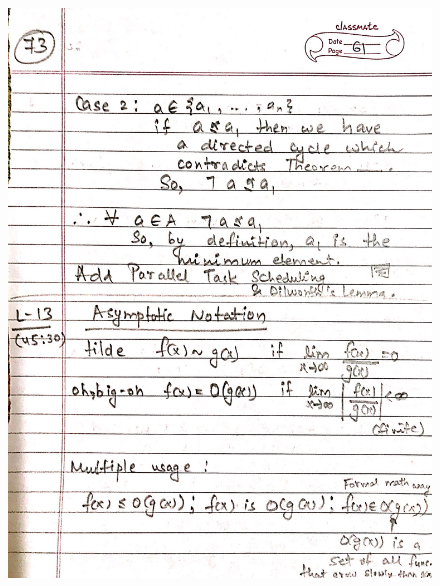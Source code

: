\begin{figure}[H]
    \centering
    \includegraphics[width=16cm, height=21cm]{"./MIT-6.042J/MIT-6042J-073"}
\end{figure}
\newpage
